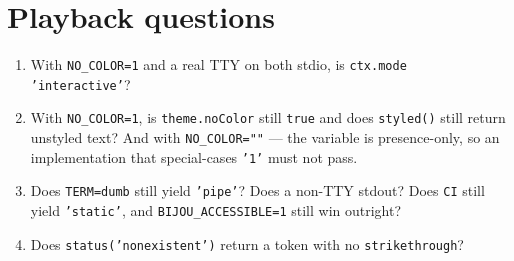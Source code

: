 \section{Playback questions}\label{record-147-playback-questions}

\begin{enumerate}
\def\labelenumi{\arabic{enumi}.}
\tightlist
\item
  With \texttt{N\allowbreak{}O\allowbreak{}\_\allowbreak{}C\allowbreak{}O\allowbreak{}L\allowbreak{}O\allowbreak{}R\allowbreak{}=\allowbreak{}1} and a real TTY on both stdio, is \texttt{c\allowbreak{}t\allowbreak{}x\allowbreak{}.\allowbreak{}m\allowbreak{}o\allowbreak{}d\allowbreak{}e} \texttt{'\allowbreak{}i\allowbreak{}n\allowbreak{}t\allowbreak{}e\allowbreak{}r\allowbreak{}a\allowbreak{}c\allowbreak{}t\allowbreak{}i\allowbreak{}v\allowbreak{}e\allowbreak{}'}?
\item
  With \texttt{N\allowbreak{}O\allowbreak{}\_\allowbreak{}C\allowbreak{}O\allowbreak{}L\allowbreak{}O\allowbreak{}R\allowbreak{}=\allowbreak{}1}, is \texttt{t\allowbreak{}h\allowbreak{}e\allowbreak{}m\allowbreak{}e\allowbreak{}.\allowbreak{}n\allowbreak{}o\allowbreak{}C\allowbreak{}o\allowbreak{}l\allowbreak{}o\allowbreak{}r} still \texttt{t\allowbreak{}r\allowbreak{}u\allowbreak{}e} and does \texttt{s\allowbreak{}t\allowbreak{}y\allowbreak{}l\allowbreak{}e\allowbreak{}d\allowbreak{}(\allowbreak{})} still return unstyled text? And with \texttt{N\allowbreak{}O\allowbreak{}\_\allowbreak{}C\allowbreak{}O\allowbreak{}L\allowbreak{}O\allowbreak{}R\allowbreak{}=\allowbreak{}"\allowbreak{}"} --- the variable is presence-only, so an implementation that special-cases \texttt{'\allowbreak{}1\allowbreak{}'} must not pass.
\item
  Does \texttt{T\allowbreak{}E\allowbreak{}R\allowbreak{}M\allowbreak{}=\allowbreak{}d\allowbreak{}u\allowbreak{}m\allowbreak{}b} still yield \texttt{'\allowbreak{}p\allowbreak{}i\allowbreak{}p\allowbreak{}e\allowbreak{}'}? Does a non-TTY stdout? Does \texttt{C\allowbreak{}I} still yield \texttt{'\allowbreak{}s\allowbreak{}t\allowbreak{}a\allowbreak{}t\allowbreak{}i\allowbreak{}c\allowbreak{}'}, and \texttt{B\allowbreak{}I\allowbreak{}J\allowbreak{}O\allowbreak{}U\allowbreak{}\_\allowbreak{}A\allowbreak{}C\allowbreak{}C\allowbreak{}E\allowbreak{}S\allowbreak{}S\allowbreak{}I\allowbreak{}B\allowbreak{}L\allowbreak{}E\allowbreak{}=\allowbreak{}1} still win outright?
\item
  Does \texttt{s\allowbreak{}t\allowbreak{}a\allowbreak{}t\allowbreak{}u\allowbreak{}s\allowbreak{}(\allowbreak{}'\allowbreak{}n\allowbreak{}o\allowbreak{}n\allowbreak{}e\allowbreak{}x\allowbreak{}i\allowbreak{}s\allowbreak{}t\allowbreak{}e\allowbreak{}n\allowbreak{}t\allowbreak{}'\allowbreak{})} return a token with no \texttt{s\allowbreak{}t\allowbreak{}r\allowbreak{}i\allowbreak{}k\allowbreak{}e\allowbreak{}t\allowbreak{}h\allowbreak{}r\allowbreak{}o\allowbreak{}u\allowbreak{}g\allowbreak{}h}?

\end{enumerate}
